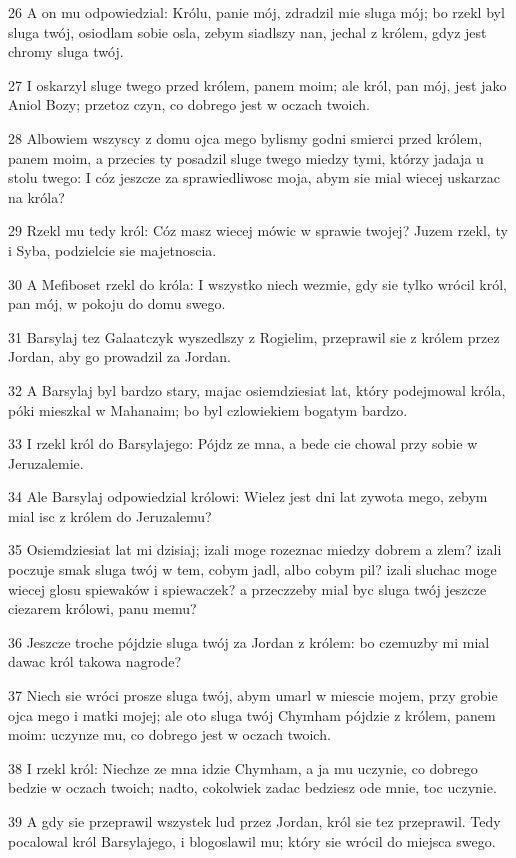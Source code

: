 \par 26 A on mu odpowiedzial: Królu, panie mój, zdradzil mie sluga mój; bo rzekl byl sluga twój, osiodlam sobie osla, zebym siadlszy nan, jechal z królem, gdyz jest chromy sluga twój.
\par 27 I oskarzyl sluge twego przed królem, panem moim; ale król, pan mój, jest jako Aniol Bozy; przetoz czyn, co dobrego jest w oczach twoich.
\par 28 Albowiem wszyscy z domu ojca mego bylismy godni smierci przed królem, panem moim, a przecies ty posadzil sluge twego miedzy tymi, którzy jadaja u stolu twego: I cóz jeszcze za sprawiedliwosc moja, abym sie mial wiecej uskarzac na króla?
\par 29 Rzekl mu tedy król: Cóz masz wiecej mówic w sprawie twojej? Juzem rzekl, ty i Syba, podzielcie sie majetnoscia.
\par 30 A Mefiboset rzekl do króla: I wszystko niech wezmie, gdy sie tylko wrócil król, pan mój, w pokoju do domu swego.
\par 31 Barsylaj tez Galaatczyk wyszedlszy z Rogielim, przeprawil sie z królem przez Jordan, aby go prowadzil za Jordan.
\par 32 A Barsylaj byl bardzo stary, majac osiemdziesiat lat, który podejmowal króla, póki mieszkal w Mahanaim; bo byl czlowiekiem bogatym bardzo.
\par 33 I rzekl król do Barsylajego: Pójdz ze mna, a bede cie chowal przy sobie w Jeruzalemie.
\par 34 Ale Barsylaj odpowiedzial królowi: Wielez jest dni lat zywota mego, zebym mial isc z królem do Jeruzalemu?
\par 35 Osiemdziesiat lat mi dzisiaj; izali moge rozeznac miedzy dobrem a zlem? izali poczuje smak sluga twój w tem, cobym jadl, albo cobym pil? izali sluchac moge wiecej glosu spiewaków i spiewaczek? a przeczzeby mial byc sluga twój jeszcze ciezarem królowi, panu memu?
\par 36 Jeszcze troche pójdzie sluga twój za Jordan z królem: bo czemuzby mi mial dawac król takowa nagrode?
\par 37 Niech sie wróci prosze sluga twój, abym umarl w miescie mojem, przy grobie ojca mego i matki mojej; ale oto sluga twój Chymham pójdzie z królem, panem moim: uczynze mu, co dobrego jest w oczach twoich.
\par 38 I rzekl król: Niechze ze mna idzie Chymham, a ja mu uczynie, co dobrego bedzie w oczach twoich; nadto, cokolwiek zadac bedziesz ode mnie, toc uczynie.
\par 39 A gdy sie przeprawil wszystek lud przez Jordan, król sie tez przeprawil. Tedy pocalowal król Barsylajego, i blogoslawil mu; który sie wrócil do miejsca swego.

